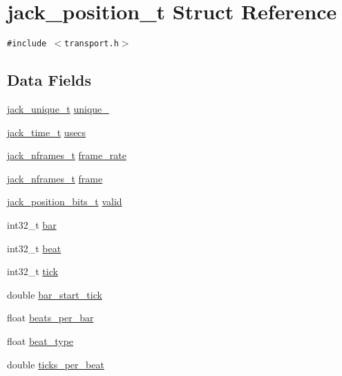 \hypertarget{structjack__position__t}{
\section{jack\_\-position\_\-t Struct Reference}
\label{structjack__position__t}
}
{\tt \#include $<$transport.h$>$}

\subsection*{Data Fields}
\begin{CompactItemize}
\item 
\hyperlink{transport_8h_35b13d418f3a4f572b3ea5849b6282f7}{jack\_\-unique\_\-t} \hyperlink{structjack__position__t_fef5d4c26b71fff9dc90704599fa27c5}{unique\_}
\item 
\hyperlink{types_8h_71d1a1356a36ae1f9e60b4361e21905e}{jack\_\-time\_\-t} \hyperlink{structjack__position__t_edb03a0d7fde02d2a6f0470bdce6e92a}{usecs}
\item 
\hyperlink{types_8h_fe9972a13782c1e282747fdb4bc46f9c}{jack\_\-nframes\_\-t} \hyperlink{structjack__position__t_74278f5e2398691cd7a0854aeeb3ae4c}{frame\_\-rate}
\item 
\hyperlink{types_8h_fe9972a13782c1e282747fdb4bc46f9c}{jack\_\-nframes\_\-t} \hyperlink{structjack__position__t_dcf3e36ee8115282aad46485cab6a4be}{frame}
\item 
\hyperlink{transport_8h_2c97bd120f26ce62aba5c2692b4482b7}{jack\_\-position\_\-bits\_\-t} \hyperlink{structjack__position__t_9f7d0ee82b6a6ca7ddeae841f3253059}{valid}
\item 
int32\_\-t \hyperlink{structjack__position__t_37b51d194a7513e45b56f6524f2d51f2}{bar}
\item 
int32\_\-t \hyperlink{structjack__position__t_ed6966981beb595bd0a50e4371805dec}{beat}
\item 
int32\_\-t \hyperlink{structjack__position__t_e5e5c0754f1e26bf915455e21cf2eba5}{tick}
\item 
double \hyperlink{structjack__position__t_221202600540df269a7b86ff7061b7eb}{bar\_\-start\_\-tick}
\item 
float \hyperlink{structjack__position__t_95db8c9493cb07af52d4d2fe851c52af}{beats\_\-per\_\-bar}
\item 
float \hyperlink{structjack__position__t_aa2956fbbf561096f9e38ab6350bdb20}{beat\_\-type}
\item 
double \hyperlink{structjack__position__t_fd4513bf48d81882ed9af87dd400a9db}{ticks\_\-per\_\-beat}

\end{CompactItemize}

